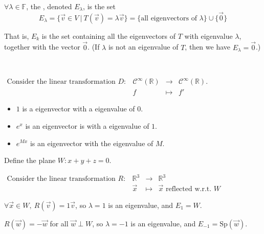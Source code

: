 \documentclass[11pt,fleqn]{book} %
\begin{document}
\setcounter{chapter}{4}
\setcounter{definitionT}{5}
\begin{definition}[Eigenspace]

    $\forall \lambda \in \mathbb{F}$, the , denoted $E_\lambda$, is the set $$E_\lambda = \{ \overrightarrow{v} \in V ~|~ T(\overrightarrow{v}) = \lambda \overrightarrow{v} \} = \{ \text{all eigenvectors of } \lambda \} \cup \{ \overrightarrow{0} \}$$

    That is, $E_k$ is the set containing all the eigenvectors of $T$ with eigenvalue $\lambda$, together with the vector $\overrightarrow{0}$. (If $\lambda$ is not an eigenvalue of $T$, then we have $E_\lambda = {\overrightarrow{0}}$.)
\end{definition}
\setcounter{chapter}{3}

\begin{example}
{~~~}

    $\begin{matrix} \text{Consider the linear transformation } D: &\mathcal{C}^\infty(\mathbb{R}) &\to &\mathcal{C}^\infty(\mathbb{R}). \\ &f &\mapsto &f' \end{matrix}$

    \begin{itemize}
        \item $1$ is a eigenvector with a eigenvalue of $0$.

        \item $e^x$ is an eigenvector is with a eigenvalue of $1$.

        \item $e^{Mx}$ is an eigenvector with the eigenvalue of $M$.
    \end{itemize}
\end{example}

\begin{example}
    Define the plane $W: x + y + z = 0$.

    $\begin{matrix} \text{Consider the linear transformation }R: &\mathbb{R}^3 &\to &\mathbb{R}^3 \\ &\overrightarrow{x} &\mapsto &\overrightarrow{x}\text{ reflected w.r.t. }W \end{matrix}$

    $\forall \overrightarrow{x} \in W,~R(\overrightarrow{v}) = 1\overrightarrow{v}$, so $\lambda = 1$ is an eigenvalue, and $E_1 = W$.

    $R(\overrightarrow{w}) = -\overrightarrow{w}$ for all $\overrightarrow{w} \perp W$, so $\lambda = -1$ is an eigenvalue, and $E_{-1} = \mathrm{Sp}(\overrightarrow{w})$.
\end{example}
\end{document}
